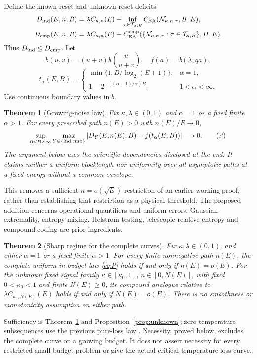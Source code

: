 \documentclass[11pt]{article}
\newtheorem{theorem}{Theorem}
\newcommand{\CEA}{C_{\mathrm{EA}}}
\newcommand{\cmp}{\mathrm{cmp}}
\begin{document}
Define the known-reset and unknown-reset deficits
\[
\begin{split}
 D_{\rm ind}(E,n,B)&=\lambda C_{\kappa,n}(E)-
       \inf_{\tau\in{\cal T}_{\alpha,B}}\CEA({\cal N}_{\kappa,n,\tau},H,E),\\
 D_{\cmp}(E,n,B)&=\lambda C_{\kappa,n}(E)-
       \CEA^{\cmp}(\{{\cal N}_{\kappa,n,\tau}:\tau\in{\cal T}_{\alpha,B}\},H,E).
\end{split}
\]
Thus \(D_{\rm ind}\le D_{\cmp}\). Let
\[
 b(u,v)=(u+v)h\!\left(\frac{u}{u+v}\right),\quad f(a)=b(\lambda,qa),
\]
\[
 t_\alpha(E,B)=
 \begin{cases}
 \min\{1,B/\log_2(E+1)\},&\alpha=1,\\
 1-2^{-((\alpha-1)/\alpha)B},&1<\alpha<\infty .
 \end{cases}
\]
Use continuous boundary values in \(b\).
\begin{theorem}[Growing-noise law]\label{thm:main}
Fix \(\kappa,\lambda\in(0,1)\) and \(\alpha=1\) or a fixed finite
\(\alpha>1\). For every prescribed path \(n(E)>0\) with \(n(E)/E\to0\),
\[
 \sup_{0\le B<\infty}\max_{Y\in\{{\rm ind},\cmp\}}
 \left|D_Y(E,n(E),B)-f(t_\alpha(E,B))\right|\longrightarrow0.
 \tag{P}\label{eq:P}
\]
The argument below uses the scientific dependencies disclosed at the end.
It claims neither a uniform blocklength nor uniformity over
all asymptotic paths at a fixed energy without a common envelope.
\end{theorem}
This removes a sufficient \(n=o(\sqrt E)\) restriction of an earlier
working proof, rather than establishing that restriction as a physical
threshold. The proposed addition concerns operational quantifiers and
uniform errors. Gaussian extremality, entropy mixing, Helstrom testing,
telescopic relative entropy and compound coding are prior ingredients.

\begin{theorem}[Sharp regime for the complete curves]\label{thm:sharp}
Fix \(\kappa,\lambda\in(0,1)\), and either \(\alpha=1\) or a fixed finite
\(\alpha>1\). For every finite nonnegative path \(n(E)\), the complete
uniform-in-budget law \eqref{eq:P} holds if and only if \(n(E)=o(E)\).
For the unknown fixed signal family
\(\kappa\in[\kappa_0,1]\), \(n\in[0,N(E)]\), with fixed
\(0<\kappa_0<1\) and finite \(N(E)\ge0\), its compound analogue relative
to \(\lambda C_{\kappa_0,N(E)}(E)\) holds if and only if \(N(E)=o(E)\).
There is no smoothness or monotonicity assumption on either path.
\end{theorem}
Sufficiency is Theorem~\ref{thm:main} and
Proposition~\ref{prop:unknown}; zero-temperature subsequences use the
previous pure-loss law \cite{previous}.
Necessity, proved below, excludes the complete curve on a growing
budget. It does not assert necessity for every restricted small-budget
problem or give the actual critical-temperature loss curve.
\end{document}
